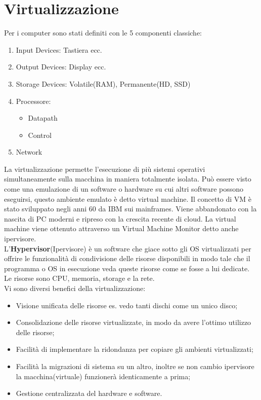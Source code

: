 \documentclass[11pt, twocolumn]{article}
\newenvironment{myitemize}
{ \begin{itemize}[topsep=0ex]
		\setlength{\itemsep}{0pt}
		\setlength{\parskip}{0pt}
		\setlength{\parsep}{0pt}     }
	{ \end{itemize}                  }
\newenvironment{myenumerate}
{ \begin{enumerate}[topsep=0ex]
		\setlength{\itemsep}{0pt}
		\setlength{\parskip}{0pt}
		\setlength{\parsep}{0pt}     }
	{ \end{enumerate}                  }
\begin{document}
\section{Virtualizzazione}
Per i computer sono stati definiti con le 5 componenti classiche:
\begin{myenumerate}
	\item Input Devices: Tastiera ecc.
	\item Output Devices: Display ecc.
	\item Storage Devices: Volatile(RAM), Permanente(HD, SSD)
	\item Processore:
	\begin{myitemize}
		\item Datapath
		\item Control
	\end{myitemize}
	\item Network
\end{myenumerate}
La virtualizzazione permette l'esecuzione di più sistemi operativi simultaneamente sulla macchina in maniera totalmente isolata. 
Può essere visto come una emulazione di un software o hardware su cui altri software possono eseguirsi, questo ambiente emulato è detto virtual machine.
Il concetto di VM è stato sviluppato negli anni 60 da IBM sui mainframes.
Viene abbandonato con la nascita di PC moderni e ripreso con la crescita recente di cloud. La virtual machine viene ottenuto attraverso un Virtual Machine Monitor detto anche ipervisore.\\
L'\textbf{Hypervisor}(Ipervisore) è un software che giace sotto gli OS virtualizzati per offrire le funzionalità di condivisione delle risorse disponibili in modo tale che il programma o OS in esecuzione veda queste risorse come se fosse a lui dedicate. 
Le risorse sono CPU, memoria, storage e la rete.\\
Vi sono diversi benefici della virtualizzazione:
\begin{myitemize}
	\item Visione unificata delle risorse es. vedo tanti dischi come un unico disco;
	\item Consolidazione delle risorse virtualizzate, in modo da avere l'ottimo utilizzo delle risorse;
	\item Facilità di implementare la ridondanza per copiare gli ambienti virtualizzati;
	\item Facilità la migrazioni di sistema su un altro, inoltre se non cambio ipervisore la macchina(virtuale) funzionerà identicamente a prima;
	\item Gestione centralizzata del hardware e software.
\end{myitemize}
\end{document}
